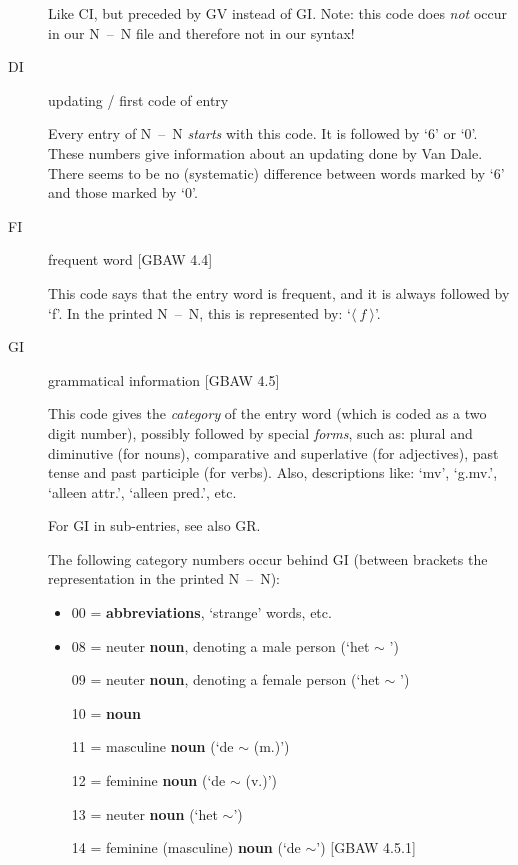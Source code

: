 \begin{description}
        Like CI, but preceded by GV instead of GI. Note: this code does {\em 
        not} occur in our N~--~N file and therefore not in our syntax!
        
   \item [DI] updating / first code of entry

        Every entry of N~--~N {\em starts} with this code. It is followed by `6'
        or `0'. These numbers give information about an updating done by Van 
        Dale. There seems to be no (systematic) difference between words
        marked by `6' and those marked by `0'. 

   \item [FI] frequent word [GBAW 4.4]

        This code says that the entry word is frequent, and it is always
        followed by `f'. In the printed N~--~N, this is represented by:
        `$\langle~f~\rangle$'.

   \item [GI] grammatical information [GBAW 4.5] 

        This code gives the {\em category} of the entry word (which is coded
        as a two digit number), possibly 
        followed by special {\em forms}, such as: plural and diminutive 
        (for nouns),
        comparative and superlative (for adjectives), past tense
        and past participle
        (for verbs). Also, descriptions like: `mv', `g.mv.', `alleen attr.',
        `alleen pred.', etc. 

        For GI in sub-entries, see also GR.

        The following category numbers occur behind GI (between 
        brackets the representation in the printed N~--~N):

   \begin{itemize}
       \item 00 = {\bf abbreviations}, `strange' words, etc.
       \item 08 = neuter {\bf noun}, denoting a male person (`het $\sim$ \male')
         
09 = neuter {\bf noun}, denoting a female person (`het $\sim$ \female')

10 = {\bf noun}

11 = masculine {\bf noun} (`de $\sim$ (m.)')

12 = feminine {\bf noun} (`de $\sim$ (v.)')

13 = neuter {\bf noun} (`het $\sim$')

14 = feminine (masculine) {\bf noun} (`de $\sim$') [GBAW 4.5.1]


\end{itemize}
\end{description}
